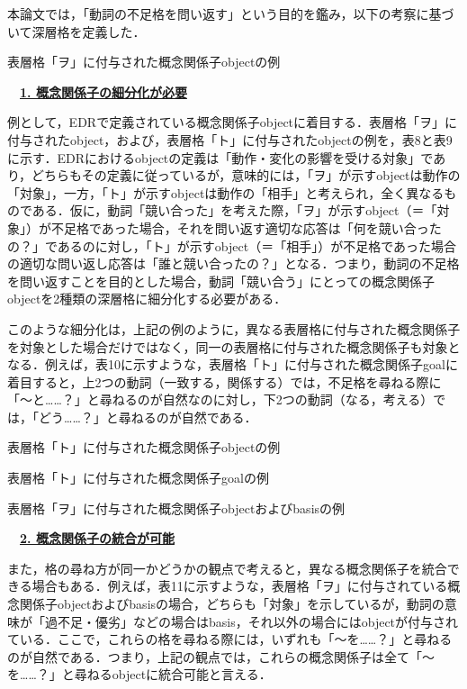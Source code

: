 \documentclass[japanese]{jnlp_1.4}
\begin{document}
本論文では，「動詞の不足格を問い返す」という目的を鑑み，以下の考察に基づいて深層格を定義した．


\begin{table}[b]
\caption{表層格「ヲ」に付与された概念関係子objectの例}
\label{table:8}

\end{table}



\noindent\textbf{　\underline{1. 概念関係子の細分化が必要}}

例として，EDRで定義されている概念関係子objectに着目する．表層格「ヲ」に付与されたobject，および，表層格「ト」に付与されたobjectの例を，表8と表9に示す．EDRにおけるobjectの定義は「動作・変化の影響を受ける対象」であり，どちらもその定義に従っているが，意味的には，「ヲ」が示すobjectは動作の「対象」，一方，「ト」が示すobjectは動作の「相手」と考えられ，全く異なるものである．仮に，動詞「競い合った」を考えた際，「ヲ」が示すobject（＝「対象」）が不足格であった場合，それを問い返す適切な応答は「何を競い合ったの？」であるのに対し，「ト」が示すobject（＝「相手」）が不足格であった場合の適切な問い返し応答は「誰と競い合ったの？」となる．つまり，動詞の不足格を問い返すことを目的とした場合，動詞「競い合う」にとっての概念関係子objectを2種類の深層格に細分化する必要がある．

このような細分化は，上記の例のように，異なる表層格に付与された概念関係子を対象とした場合だけではなく，同一の表層格に付与された概念関係子も対象となる．例えば，表10に示すような，表層格「ト」に付与された概念関係子goalに着目すると，上2つの動詞（一致する，関係する）では，不足格を尋ねる際に「〜と……？」と尋ねるのが自然なのに対し，下2つの動詞（なる，考える）では，「どう……？」と尋ねるのが自然である．

\begin{table}[t]
\caption{表層格「ト」に付与された概念関係子objectの例}
\label{table:9}

\end{table}
\begin{table}[t]
\caption{表層格「ト」に付与された概念関係子goalの例}
\label{table:10}

\end{table}
\begin{table}[t]
\caption{表層格「ヲ」に付与された概念関係子objectおよびbasisの例}
\label{table:11}

\end{table}


\noindent\textbf{　\underline{2. 概念関係子の統合が可能}}

また，格の尋ね方が同一かどうかの観点で考えると，異なる概念関係子を統合できる場合もある．例えば，表11に示すような，表層格「ヲ」に付与されている概念関係子objectおよびbasisの場合，どちらも「対象」を示しているが，動詞の意味が「過不足・優劣」などの場合はbasis，それ以外の場合にはobjectが付与されている．ここで，これらの格を尋ねる際には，いずれも「〜を……？」と尋ねるのが自然である．つまり，上記の観点では，これらの概念関係子は全て「〜を……？」と尋ねるobjectに統合可能と言える．
\end{document}
